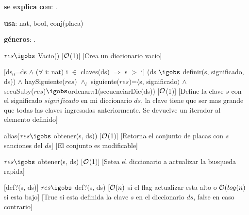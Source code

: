 \begin{Interfaz}

	\textbf{se explica con}: .

	\textbf{usa}: nat, bool, conj(placa)

	\textbf{géneros}: .


	{$res \igobs$ Vacio()}
	[$\mathcal{O}$(1)]
	[Crea un diccionario vacio]

	[ds$_0$=ds $\land$ ($\forall$ i: nat) i $\in$ claves(ds) $\Rightarrow$ s $>$ i]
	{(ds $\igobs$ definir(s, significado, ds)) $\land$ haySiguiente($res$) $\land_l$ siguiente($res$)=$\langle$s, significado$\rangle$ $\land$\\
	secuSuby($res$)$\igobs$ordenar$\pi$1(secuenciarDic(ds))}
	[$\mathcal{O}$(1)]
	[Define la clave $s$ con el significado $significado$ en mi diccionario $ds$, la clave tiene que ser mas grande que todas las claves ingresadas anteriormente. Se devuelve un iterador al elemento definido]
	
	{alias($res \igobs$ obtener(s, ds))}
	[$\mathcal{O}$(1)]
	[Retorna el conjunto de placas con $s$ sanciones del $ds$]
	[El conjunto es modificable]

	{$res \igobs$ obtener(s, ds)}
	[$\mathcal{O}$(1)]
	[Setea el diccionario a actualizar la busqueda rapida]

	[def?(s, ds)]
	{$res \igobs$ def?(s, ds)}  
	[$\mathcal{O}(n)$ si el flag actualizar esta alto o $\mathcal{O}(log(n)$ si esta bajo]
	[True si esta definida la clave $s$ en el diccionario $ds$, false en caso contrario]
	
\end{Interfaz}

